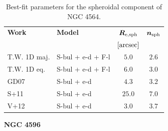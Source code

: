 \documentclass[preprint2]{emulateapj}
\begin{document}
  \begin{table}[h]
  \small
  \caption{Best-fit parameters for the spheroidal component of NGC 4564.}
  \begin{center}
  \begin{tabular}{llcc}
  \hline
  {\bf Work} & {\bf Model}   & $\bm R_{\rm e,sph}$    & $\bm n_{\rm sph}$ \\
    &  &  $[\rm arcsec]$ & \\
  \hline
  T.W. 1D maj. & S-bul + e-d + F-l & $5.0$  &  $2.6$ \\
  T.W. 1D eq.  & S-bul + e-d + F-l & $6.0$  &  $3.0$ \\
  \hline
  GD07      & S-bul + e-d & $4.3$  &  $3.2$ \\
  S+11      & S-bul + e-d & $25.0$ &  $7.0$ \\
  V+12      & S-bul + e-d & $3.0$  &  $3.7$ \\
  \hline
  \end{tabular}
  \end{center}
  \label{tab:n4564}
  \end{table}

  \clearpage\newpage\noindent
  {\bf NGC 4596 \\}
\end{document}
